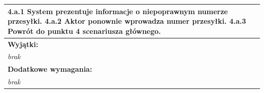 \begin{center}
\begin{longtable}[h]{|p{1.6cm}|p{13.5cm}|}
{4.a.1 System prezentuje informacje o niepoprawnym numerze przesyłki. \newline
4.a.2 Aktor ponownie wprowadza numer przesyłki. \newline
4.a.3 Powrót do punktu 4 scenariusza głównego. \newline
} \\ \hline
\multicolumn{2}{|p{15.1cm}|}{\textbf{Wyjątki:}} \\
\multicolumn{2}{|p{15.1cm}|}{
\textit{brak}
} \\ \hline
\multicolumn{2}{|p{15.1cm}|}{\textbf{Dodatkowe wymagania:}} \\
\multicolumn{2}{|p{15.1cm}|}{
\textit{brak}
} \\
\hline
\end{longtable}
\end{center}

